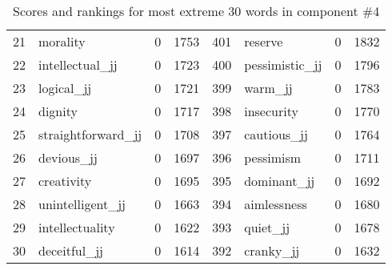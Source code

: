 \begin{table}[tbp]
\begin{tabular}{| rlr@{.}l | rlr@{.}l |}
    21 & morality & 0 & 1753    &    401 & reserve & 0 & 1832 \\
    22 & intellectual\_jj & 0 & 1723    &    400 & pessimistic\_jj & 0 & 1796 \\
    23 & logical\_jj & 0 & 1721    &    399 & warm\_jj & 0 & 1783 \\
    24 & dignity & 0 & 1717    &    398 & insecurity & 0 & 1770 \\
    25 & straightforward\_jj & 0 & 1708    &    397 & cautious\_jj & 0 & 1764 \\
    26 & devious\_jj & 0 & 1697    &    396 & pessimism & 0 & 1711 \\
    27 & creativity & 0 & 1695    &    395 & dominant\_jj & 0 & 1692 \\
    28 & unintelligent\_jj & 0 & 1663    &    394 & aimlessness & 0 & 1680 \\
    29 & intellectuality & 0 & 1622    &    393 & quiet\_jj & 0 & 1678 \\
    30 & deceitful\_jj & 0 & 1614    &    392 & cranky\_jj & 0 & 1632 \\
    \hline
    \end{tabular}
    \caption{Scores and rankings for most extreme 30 words in component \#4} 
\end{table}
\clearpage
